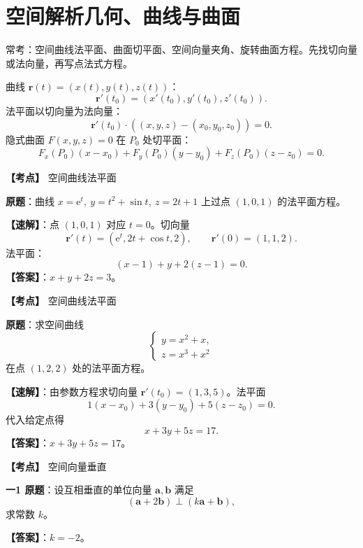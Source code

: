 ﻿\documentclass[11pt,a4paper,UTF8]{ctexart}
\newcommand{\ee}{\mathrm e}
\begin{document}
\newpage\section{空间解析几何、曲线与曲面}

\begin{identifybox}[考频定位]
常考：空间曲线法平面、曲面切平面、空间向量夹角、旋转曲面方程。先找切向量或法向量，再写点法式方程。
\end{identifybox}

\begin{templatebox}[考场模板]
曲线 $\boldsymbol r(t)=(x(t),y(t),z(t))$：
\[
\boldsymbol r'(t_0)=(x'(t_0),y'(t_0),z'(t_0)).
\]
法平面以切向量为法向量：
\[
\boldsymbol r'(t_0)\cdot((x,y,z)-(x_0,y_0,z_0))=0.
\]
隐式曲面 $F(x,y,z)=0$ 在 $P_0$ 处切平面：
\[
F_x(P_0)(x-x_0)+F_y(P_0)(y-y_0)+F_z(P_0)(z-z_0)=0.
\]
\end{templatebox}

\begin{answerbox}[2020--2021 一-1]
\textbf{【考点】} 空间曲线法平面

\textbf{原题}：曲线 $x=\ee^t,\ y=t^2+\sin t,\ z=2t+1$ 上过点 $(1,0,1)$ 的法平面方程。

\textbf{【速解】}：点 $(1,0,1)$ 对应 $t=0$。切向量
\[
\boldsymbol r'(t)=(\ee^t,2t+\cos t,2),\qquad \boldsymbol r'(0)=(1,1,2).
\]
法平面：
\[
(x-1)+y+2(z-1)=0.
\]
\textbf{【答案】}：$x+y+2z=3$。
\end{answerbox}

\begin{answerbox}[2022--2023 一-2]
\textbf{【考点】} 空间曲线法平面

\textbf{原题}：求空间曲线
\[
\begin{cases}
y=x^2+x,\\
z=x^3+x^2
\end{cases}
\]
在点 $(1,2,2)$ 处的法平面方程。

\textbf{【速解】}：由参数方程求切向量 $\boldsymbol r'(t_0)=(1,3,5)$。法平面
\[
1(x-x_0)+3(y-y_0)+5(z-z_0)=0.
\]
代入给定点得
\[
x+3y+5z=17.
\]
\textbf{【答案】}：$x+3y+5z=17$。
\end{answerbox}

\begin{answerbox}[2023--2024 一-1]
\textbf{【考点】} 空间向量垂直

\textbf{一1 原题}：设互相垂直的单位向量 $\boldsymbol a,\boldsymbol b$ 满足
\[
(\boldsymbol a+2\boldsymbol b)\perp(k\boldsymbol a+\boldsymbol b),
\]
求常数 $k$。

\textbf{【答案】}：$k=-2$。

\end{answerbox}
\end{document}
